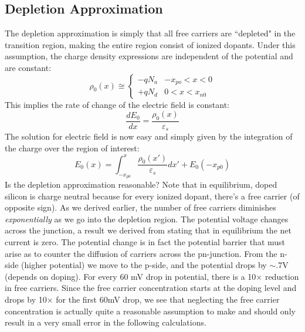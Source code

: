 \subsection{Depletion Approximation}
The depletion approximation is simply that all free carriers are ``depleted" in the transition region, making the entire region consist of ionized dopants.  Under this assumption, the charge density expressions are independent of the potential and are constant:
\begin{equation}
{\rho _0}(x) \cong \left\{ 
	\begin{array}{*{20}{c}}
 		 - q{N_a} &  - {x_{po}} < x < 0\\
 		 + q{N_d} & 0 < x < {x_{n0}}
 \end{array} 
 \right.
\end{equation}
This implies the rate of change of the electric field is constant:
\begin{equation} 
	\frac{{d{E_0}}}{{dx}} = \frac{{{\rho _0}(x)}}{{{\varepsilon _s}}}
\end{equation}
The solution for electric field is now easy and simply given by the integration of the charge over the region of interest:
\begin{equation} {E_0}(x) = \int_{ - {x_{p0}}}^x {\frac{{{\rho _0}(x')}}{{{\varepsilon _s}}}dx'}  + {E_0}( - {x_{p0}}) 
\end{equation}
Is the depletion approximation reasonable?  Note that in equilibrium, doped silicon is charge neutral because for every ionized dopant, there's a free carrier (of opposite sign).   As we derived earlier, the number of free carriers diminishes \textit{exponentially} as we go into the depletion region.  The potential voltage changes across the junction, a result we derived from stating that in equilibrium the net  current is zero.  The potential change is in fact the potential barrier that must arise as to counter the diffusion of carriers across the pn-junction.   From the n-side (higher potential) we move to the p-side, and the potential drops by $\sim$.7V (depends on doping).  For every 60 mV drop in potential, there is a 10$\times$ reduction in free carriers.  Since the free carrier concentration starts at the doping level and drops by 10$\times$ for the first 60mV drop, we see that neglecting the free carrier concentration is actually quite a reasonable assumption to make and should only result in a very small error in the following calculations.
 
